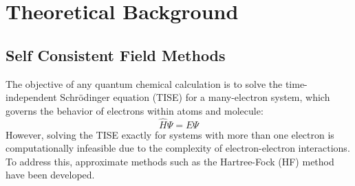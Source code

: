 \chapter{Theoretical Background}\label{ch:theory}

\section{Self Consistent Field Methods} \label{sec:SCF}
The objective of any quantum chemical calculation is to solve the time-independent Schrödinger equation (TISE) for a many-electron system, which governs the behavior of electrons within atoms and molecule:
\begin{equation}\label{eq:TISE}
    \hat{H} \Psi = E \Psi
\end{equation}
However, solving the TISE exactly for systems with more than one electron is computationally infeasible due to the complexity of electron-electron interactions. To address this, approximate methods such as the Hartree-Fock (HF) method have been developed\cite{hartree1928wave,fock1930naherungsmethode}.

